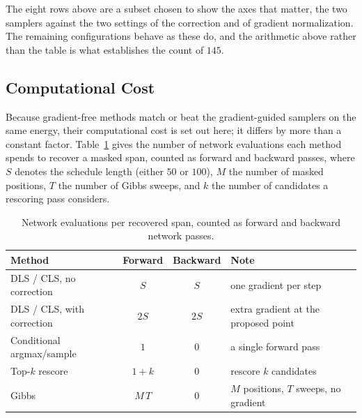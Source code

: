 The eight rows above are a subset chosen to show the axes that matter, the two samplers against the two settings of the correction and of gradient normalization. The remaining configurations behave as these do, and the arithmetic above rather than the table is what establishes the count of $145$.

\subsection{Computational Cost}
\label{app:cost}

Because gradient-free methods match or beat the gradient-guided samplers on the same energy, their computational cost is set out here; it differs by more than a constant factor. Table~\ref{tab:cost} gives the number of network evaluations each method spends to recover a masked span, counted as forward and backward passes, where $S$ denotes the schedule length (either $50$ or $100$), $M$ the number of masked positions, $T$ the number of Gibbs sweeps, and $k$ the number of candidates a rescoring pass considers.

\begin{table}[htbp]
    \centering
    \small
    \setlength{\tabcolsep}{4pt}
    \begin{tabular}{lccp{3.9cm}}
        \toprule
        Method & Forward & Backward & Note \\
        \midrule
        DLS / CLS, no correction  & $S$    & $S$  & one gradient per step \\
        DLS / CLS, with correction & $2S$   & $2S$ & extra gradient at the proposed point \\
        Conditional argmax/sample  & $1$    & $0$  & a single forward pass \\
        Top-$k$ rescore            & $1+k$  & $0$  & rescore $k$ candidates \\
        Gibbs                      & $M\,T$ & $0$  & $M$ positions, $T$ sweeps, no gradient \\
        \bottomrule
    \end{tabular}
    \caption[Network evaluations per recovered span.]{Network evaluations per recovered span, counted as forward and backward network passes.}
    \label{tab:cost}
\end{table}


